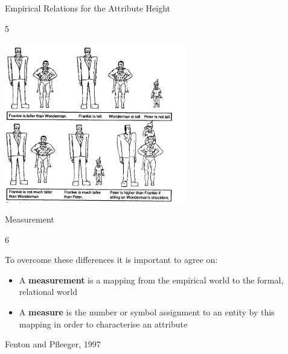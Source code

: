 \documentclass{beamer}
\begin{document}
\begin{frame}{\centerline{Empirical Relations for the Attribute Height
}}
5

\begin{center}
\includegraphics[width=80mm]{A2022.IDSEPC.SperimentazioneDeduzione/img-img08.png}
\end{center}

\end{frame}

\begin{frame}{\centerline{Measurement}}
6

To overcome these differences it is important to agree on:

\begin{itemize}
\item  A \textbf{measurement} is a mapping from the empirical world to the formal, relational world
\item  A \textbf{measure} is the number or symbol assignment to an entity by this mapping in order to characterise an attribute
\end{itemize}

\begin{flushright}
Fenton and Pfleeger, 1997
\end{flushright}

\end{frame}
\end{document}
